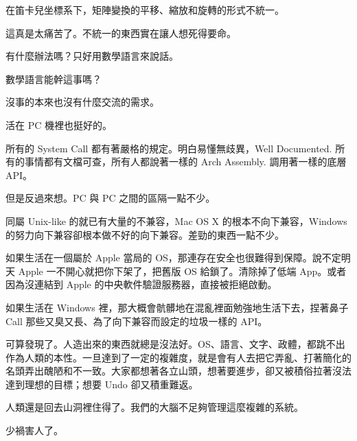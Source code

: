 \documentclass[
]{article}
\begin{document}
在笛卡兒坐標系下，矩陣變換的平移、縮放和旋轉的形式不統一。

這真是太痛苦了。不統一的東西實在讓人想死得要命。

有什麼辦法嗎？只好用數學語言來說話。

數學語言能幹這事嗎？

沒事的本來也沒有什麼交流的需求。

活在 PC 機裡也挺好的。

所有的 System Call 都有著嚴格的規定。明白易懂無歧異，Well Documented.
所有的事情都有文檔可查，所有人都說著一樣的 Arch Assembly.
調用著一樣的底層 API。

但是反過來想。PC 與 PC 之間的區隔一點不少。

同屬 Unix-like 的就已有大量的不兼容，Mac OS X 的根本不向下兼容，Windows
的努力向下兼容卻根本做不好的向下兼容。差勁的東西一點不少。

如果生活在一個屬於 Apple 當局的
OS，那連存在安全也很難得到保障。說不定明天 Apple
一不開心就把你下架了，把舊版 OS 給鎖了。清除掉了低端
App。或者因為沒連結到 Apple 的中央軟件驗證服務器，直接被拒絕啟動。

如果生活在 Windows 裡，那大概會骯髒地在混亂裡面勉強地生活下去，捏著鼻子
Call 那些又臭又長、為了向下兼容而設定的垃圾一樣的 API。

可算發現了。人造出來的東西就總是沒法好。OS、語言、文字、政體，都跳不出作為人類的本性。一旦達到了一定的複雜度，就是會有人去把它弄亂、打著簡化的名頭弄出醜陋和不一致。大家都想著各立山頭，想著要進步，卻又被積俗拉著沒法達到理想的目標；想要
Undo 卻又積重難返。

人類還是回去山洞裡住得了。我們的大腦不足夠管理這麼複雜的系統。

少禍害人了。
\end{document}
